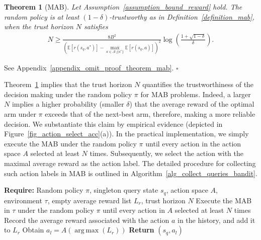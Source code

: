 \documentclass[10pt]{article}
\DeclareMathOperator*{\argmax}{arg\,max}
\newtheorem{theorem}{Theorem}
\newenvironment{myproof}{{\noindent\it Proof. }}{\hfill $\square$ \par}
\def\mbE{{\ensuremath{\mathbb E}}}
\begin{document}
\begin{theorem}[MAB]\label{theorem_mab}
    Let Assumption~\ref{assumption_bound_reward} hold. The random policy is at least $(1-\delta)$-trustworthy as in Definition~\ref{definition_mab}, when the trust horizon $N$ satisfies
    \begin{align}
        N \geq \frac{8B^2}{\left(\mbE[r(s_q, a^*)] - \max\limits_{a \in A \setminus \{a^*\}} \mbE[r(s_q, a)] \right)^2} \log \left( \frac{1+\sqrt{1-\delta}}{\delta} \right).
    \end{align}
\end{theorem}
\begin{myproof}
    See Appendix~\ref{appendix_omit_proof_theorem_mab}.
\end{myproof}
Theorem~\ref{theorem_mab} implies that the trust horizon $N$ quantifies the trustworthiness of the decision making under the random policy $\pi$ for MAB problems. Indeed, a larger $N$ implies a higher probability (smaller $\delta$) that the average reward of the optimal arm under $\pi$ exceeds that of the next-best arm, therefore, making a more reliable decision. We substantiate this claim by empirical evidence (depicted in Figure~\ref{fig_action_select_acc}(a)).
In the practical implementation, we simply execute the MAB under the random policy $\pi$ until every action in the action space $A$ selected at least $N$ times.
Subsequently, we select the action with the maximal average reward as the action label. The detailed procedure for collecting such action labels in MAB is outlined in Algorithm~\ref{alg_collect_queries_bandit}.
\begin{algorithm}
\caption{Collecting Query States and Action Labels under Random Policy (MAB)}         \label{alg_collect_queries_bandit}
\begin{algorithmic}[1]
		\STATE \textbf{Require:} Random policy $\pi$, singleton query state $s_q$, action space $A$, environment $\tau$, empty average reward list $L_r$, trust horizon $N$
            \STATE Execute the MAB in $\tau$ under the random policy $\pi$ until every action in $A$ selected at least $N$ times
                \STATE Record the average reward associated with the action $a$ in the history, and add it to $L_r$
            \ENDFOR
            \STATE Obtain $a_l = A(\argmax (L_r))$
        \STATE \textbf{Return} $(s_q, a_l)$
\end{algorithmic}
\end{algorithm}
\end{document}
